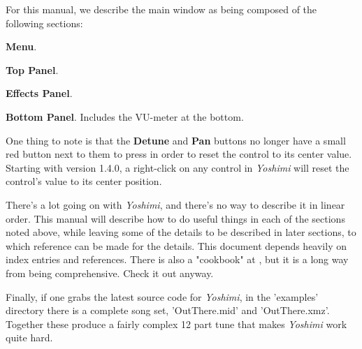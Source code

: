 \documentclass[
 11pt,
 twoside,
 a4paper,
 final                                 %
]{article}
\begin{document}
   For this manual, we describe the main window as being composed of
   the following sections:

\begin{enumber}
   \item \textbf{Menu}.
   \item \textbf{Top Panel}.
   \item \textbf{Effects Panel}.
   \item \textbf{Bottom Panel}.  Includes the VU-meter at the bottom.
\end{enumber}

   One thing to note is that the \textbf{Detune} and \textbf{Pan} buttons no
   longer have a small red button next to them to press in order to reset the
   control to its center value.  Starting with version 1.4.0, a right-click on
   any control in \textsl{Yoshimi} will reset the control's value to its center
   position.

   There's a lot going on with \textsl{Yoshimi}, and there's no way to describe
   it in linear order.  This manual will describe how to do useful things in
   each of the sections noted above, while leaving some of the details to be
   described in later sections, to which reference can be made for the details.
   This document depends heavily on index entries and references.
   There is also a "cookbook" at \cite{book}, but it is a long way from being
   comprehensive.  Check it out anyway.

   Finally, if one grabs the latest source code for \textsl{Yoshimi}, in the
   'examples' directory there is a complete song set, 'OutThere.mid' and
   'OutThere.xmz'. Together these produce a fairly complex 12 part tune that
   makes \textsl{Yoshimi} work quite hard.

\rhead{\rightmark}         %















\end{document}
